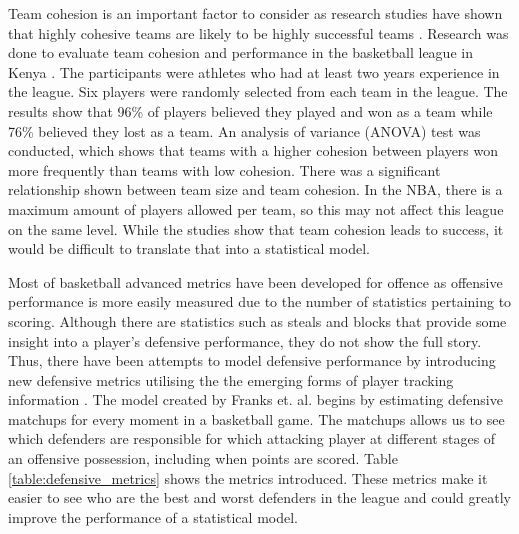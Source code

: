 Team cohesion is an important factor to consider as research studies have shown that highly cohesive teams are likely to be highly successful teams \citep{team_cohesion}.  Research was done to evaluate team cohesion and performance in the basketball league in Kenya \citep{basketball_team_cohesion}.  The participants were athletes who had at least two years experience in the league.  Six players were randomly selected from each team in the league.  The results show that 96\% of players believed they played and won as a team while 76\% believed they lost as a team.  An analysis of variance (ANOVA) test was conducted, which shows that teams with a higher cohesion between players won more frequently than teams with low cohesion.  There was a significant relationship shown between team size and team cohesion.  In the NBA, there is a maximum amount of players allowed per team, so this may not affect this league on the same level.  While the studies show that team cohesion leads to success, it would be difficult to translate that into a statistical model.

Most of basketball advanced metrics have been developed for offence as offensive performance is more easily measured due to the number of statistics pertaining to scoring.  Although there are statistics such as steals and blocks that provide some insight into a player's defensive performance, they do not show the full story.  Thus, there have been attempts to model defensive performance by introducing new defensive metrics utilising the the emerging forms of player tracking information \citep{nba_defense}.  The model created by Franks et. al. \citep{nba_defense} begins by estimating defensive matchups for every moment in a basketball game.  The matchups allows us to see which defenders are responsible for which attacking player at different stages of an offensive possession, including when points are scored.  Table \ref{table:defensive_metrics} shows the metrics introduced.  These metrics make it easier to see who are the best and worst defenders in the league and could greatly improve the performance of a statistical model.

